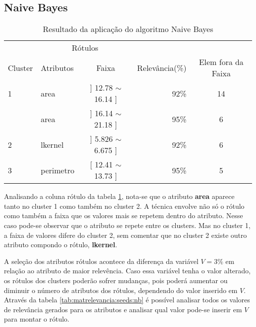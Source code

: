 \subsection{Naive Bayes} \label{ssec:nb}
\begin{table}[!h]
\centering
\caption{Resultado da aplicação do algoritmo Naive Bayes}
\label{tab:rot:seeds:nb}
\begin{tabular}{llcrc}
\hline  \hline
\multicolumn{1}{c}{\cellcolor[HTML]{FFFFFF}} & \multicolumn{2}{c}{Rótulos}                & \multicolumn{1}{r}{}               & \\ \cline{2-3}
Cluster                                      & Atributos      & \multicolumn{1}{c}{Faixa} & \multicolumn{1}{c}{Relevância(\%)} & Elem fora da Faixa\\ \hline \hline
1                                            & area           & ] 12.78 $\sim$  16.14 ]   & 92\%                               & 14\\  \hline
                                             & area           & ] 16.14 $\sim$  21.18 ]   & 95\%                               & 6\\ 
\multirow{-2}{*}{2}                          & lkernel        & ] 5.826 $\sim$  6.675 ]   & 92\%                               & 6\\  \hline
3                                            & perimetro      & [ 12.41 $\sim$  13.73 ]   & 95\%                               & 5\\ \hline \hline
\end{tabular}
\end{table}



Analisando a coluna rótulo da tabela \ref{tab:rot:seeds:nb}, nota-se que o atributo \textbf{area} aparece tanto no  cluster 1 como também no cluster 2. A técnica envolve não só o rótulo como também a faixa que os valores mais se repetem dentro do atributo. Nesse caso pode-se observar que o atributo se repete entre os clusters. Mas no cluster 1, a faixa de valores difere do cluster 2, sem comentar que no cluster 2 existe outro atributo compondo o rótulo, \textbf{lkernel}.

A seleção dos atributos rótulos acontece da diferença da variável ${V=3\%}$ em relação ao atributo de maior relevência. Caso essa variável tenha o valor alterado, os rótulos dos clusters poderão sofrer mudanças, pois poderá aumentar  ou diminuir o número de atributos dos rótulos, dependendo do valor inserido em ${V}$. Através da tabela \ref{tab:matrelevancia:seeds:nb} é possível analisar todos os valores de relevância gerados para os atributos e analisar qual valor pode-se inserir em ${V}$ para montar o rótulo.

